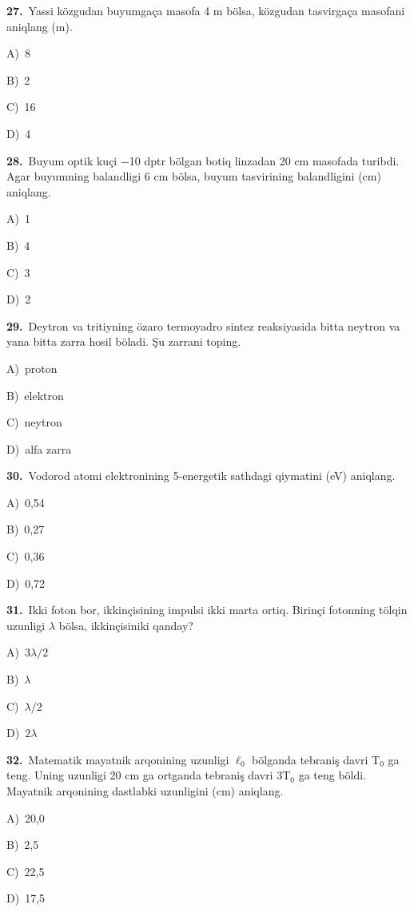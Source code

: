 \documentclass[11pt,a4paper]{article}
\newcommand{\opt}[2]{\hspace*{4mm}#1)\ #2\par}
\begin{document}
\noindent\begin{minipage}{\linewidth}
\textbf{27.}\ Yassi közgudan buyumgaça masofa 4 m bölsa, közgudan tasvirgaça masofani aniqlang (m).\par\smallskip
\opt{A}{8}
\opt{B}{2}
\opt{C}{16}
\opt{D}{4}
\end{minipage}\vspace{9pt}\par
\noindent\begin{minipage}{\linewidth}
\textbf{28.}\ Buyum optik kuçi $-$10 dptr bölgan botiq linzadan 20 cm masofada turibdi. Agar buyumning balandligi 6 cm bölsa, buyum tasvirining balandligini (cm) aniqlang.\par\smallskip
\opt{A}{1}
\opt{B}{4}
\opt{C}{3}
\opt{D}{2}
\end{minipage}\vspace{9pt}\par
\noindent\begin{minipage}{\linewidth}
\textbf{29.}\ Deytron va tritiyning özaro termoyadro sintez reaksiyasida bitta neytron va yana bitta zarra hosil böladi. Şu zarrani toping.\par\smallskip
\opt{A}{proton}
\opt{B}{elektron}
\opt{C}{neytron}
\opt{D}{alfa zarra}
\end{minipage}\vspace{9pt}\par
\noindent\begin{minipage}{\linewidth}
\textbf{30.}\ Vodorod atomi elektronining 5-energetik sathdagi qiymatini (eV) aniqlang.\par\smallskip
\opt{A}{0,54}
\opt{B}{0,27}
\opt{C}{0,36}
\opt{D}{0,72}
\end{minipage}\vspace{9pt}\par
\noindent\begin{minipage}{\linewidth}
\textbf{31.}\ Ikki foton bor, ikkinçisining impulsi ikki marta ortiq. Birinçi fotonning tölqin uzunligi $\lambda$ bölsa, ikkinçisiniki qanday?\par\smallskip
\opt{A}{$3\lambda/2$}
\opt{B}{$\lambda$}
\opt{C}{$\lambda/2$}
\opt{D}{$2\lambda$}
\end{minipage}\vspace{9pt}\par
\noindent\begin{minipage}{\linewidth}
\textbf{32.}\ Matematik mayatnik arqonining uzunligi $\ell_{0}$ bölganda tebraniş davri T$_{0}$ ga teng. Uning uzunligi 20 cm ga ortganda tebraniş davri 3T$_{0}$ ga teng böldi. Mayatnik arqonining dastlabki uzunligini (cm) aniqlang.\par\smallskip
\opt{A}{20,0}
\opt{B}{2,5}
\opt{C}{22,5}
\opt{D}{17,5}
\end{minipage}\vspace{9pt}\par
\end{document}
